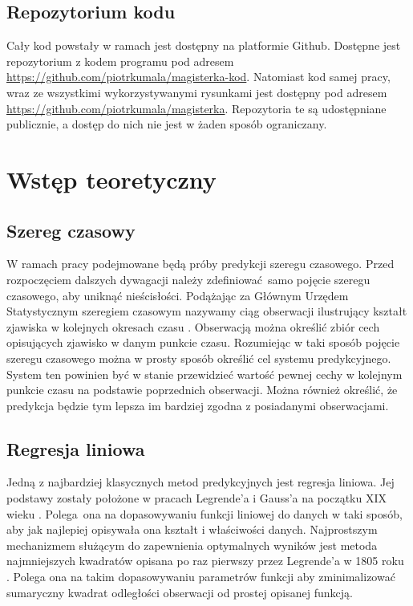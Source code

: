\documentclass[10pt,a4paper]{article}
\begin{document}
\subsection{Repozytorium kodu}
Cały kod powstały w ramach jest dostępny na platformie Github. Dostępne jest repozytorium z kodem programu pod adresem \url{https://github.com/piotrkumala/magisterka-kod}. Natomiast kod samej pracy, wraz ze wszystkimi wykorzystywanymi rysunkami jest dostępny pod adresem \url{https://github.com/piotrkumala/magisterka}. Repozytoria te są udostępniane publicznie, a dostęp do nich nie jest w żaden sposób ograniczany. 

\newpage
\section{Wstęp teoretyczny}
\subsection{Szereg czasowy}
W ramach pracy podejmowane będą próby predykcji szeregu czasowego. Przed rozpoczęciem dalszych dywagacji należy zdefiniować samo pojęcie szeregu czasowego, aby uniknąć nieścisłości. Podążając za Głównym Urzędem Statystycznym szeregiem czasowym nazywamy ciąg obserwacji ilustrujący kształt zjawiska w kolejnych okresach czasu \cite{GUS}. Obserwacją można określić zbiór cech opisujących zjawisko w danym punkcie czasu. Rozumiejąc w taki sposób pojęcie szeregu czasowego można w prosty sposób określić cel systemu predykcyjnego. System ten powinien być w stanie przewidzieć wartość pewnej cechy w kolejnym punkcie czasu na podstawie poprzednich obserwacji. Można również określić, że predykcja będzie tym lepsza im bardziej zgodna z posiadanymi obserwacjami. 

\subsection{Regresja liniowa}
Jedną z najbardziej klasycznych metod predykcyjnych jest regresja liniowa. Jej podstawy zostały położone w pracach Legrende'a i Gauss'a na początku XIX wieku \cite{seal1967studies}. Polega ona na dopasowywaniu funkcji liniowej do danych w taki sposób, aby jak najlepiej opisywała ona kształt i właściwości danych. Najprostszym mechanizmem służącym do zapewnienia optymalnych wyników jest metoda najmniejszych kwadratów opisana po raz pierwszy przez Legrende'a w 1805 roku \cite{legendre1806nouvelles}. Polega ona na takim dopasowywaniu parametrów funkcji aby zminimalizować sumaryczny kwadrat odległości obserwacji od prostej opisanej funkcją. 
\end{document}
